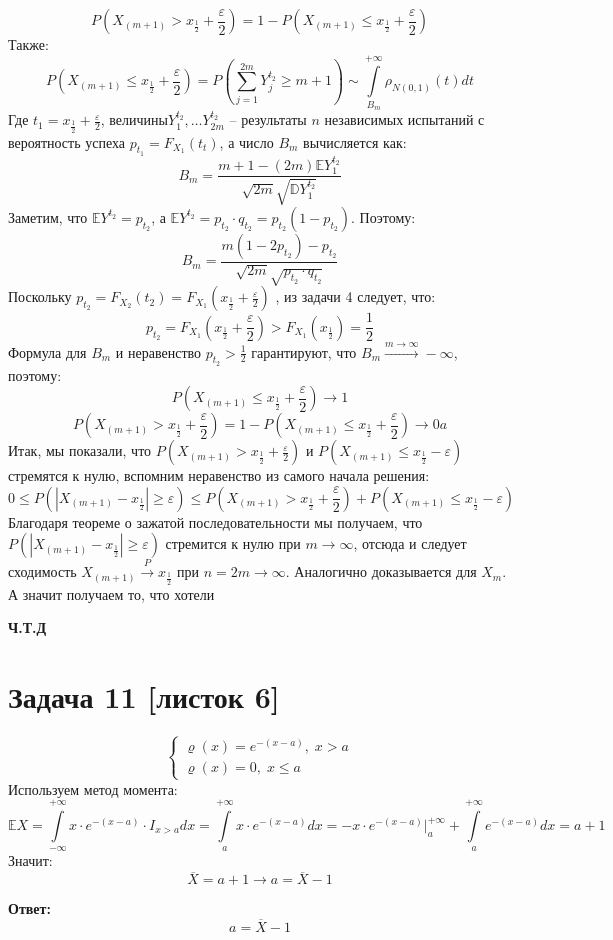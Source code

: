 \documentclass[a4paper,12pt]{article}
\begin{document}
\[
P\left(X_{(m + 1)} > x_{\frac12} + \frac{\varepsilon}{2}\right) = 1 - P\left(X_{(m + 1)} \leq  x_{\frac12} + \frac{\varepsilon}{2}\right) 
\]
Также:
\[
P\left(X_{(m + 1)} \leq  x_{\frac12} + \frac{\varepsilon}{2}\right)  = P \left(
\sum_{j = 1}^{2m} Y_j^{t_2} \geq m + 1
\right) \sim \int\limits_{B_m}^{+\infty} \rho_{N(0, 1)} (t) dt 
\]
Где $t_1 = x_{\frac12} + \frac{\varepsilon}{2}$, величины$Y_1^{t_2}, \ldots Y_{2m}^{t_2}$ -- результаты $n$ независимых испытаний с вероятность успеха $p_{t_1} = F_{X_1}(t_t)$, а число $B_m$ вычисляется как:
\[
B_m = \frac{m + 1 - (2m) \mathbb{E} Y_1^{t_2}}{\sqrt{2m} \sqrt{\mathbb{D} Y_1^{t_2}}} 
\]
Заметим, что $\mathbb{E} Y^{t_2} = p_{t_2}$, а $\mathbb{E} Y^{t_2} = p_{t_2} \cdot q_{t_2} = p_{t_2} (1 - p_{t_2})$. Поэтому:
\[
B_m = \frac{m(1 - 2p_{t_2}) - p_{t_2}}{\sqrt{2m} \sqrt{p_{t_2} \cdot q_{t_2}}}
\]
Поскольку $p_{t_2} = F_{X_2} (t_2) = F_{X_1} (x_{\frac{1}{2}} + \frac{\varepsilon}{2})$ , из задачи 4 следует, что:
\[
p_{t_2} = F_{X_1} (x_{\frac12} + \frac{\varepsilon}{2}) > F_{X_1} (x_{\frac12}) = \frac12 
\]
Формула для $B_m$ и неравенство $p_{t_2} > \frac12$ гарантируют, что $B_m \overset{m \rightarrow \infty}{\longrightarrow} -\infty$, поэтому:
\[
P\left(X_{(m + 1)} \leq  x_{\frac12} + \frac{\varepsilon}{2}\right)  \rightarrow 1
\]
\[
P\left(X_{(m + 1)} > x_{\frac12} + \frac{\varepsilon}{2}\right) = 1 -  P\left(X_{(m + 1)} \leq  x_{\frac12} + \frac{\varepsilon}{2}\right)  \rightarrow 0 a
\]
Итак, мы показали, что $P\left(X_{(m + 1)} > x_{\frac12} + \frac{\varepsilon}{2}\right)$ и $P\left(X_{(m + 1)} \leq  x_{\frac12} - \varepsilon \right)$ стремятся к нулю, вспомним неравенство из самого начала решения:
\[
0 \leq P \left(
|
X_{(m + 1)} - x_{\frac12} 
| 
\geq \varepsilon
\right)
\leq 
P\left(X_{(m + 1)} > x_{\frac12} + \frac{\varepsilon}{2}\right) + P\left(X_{(m + 1)} \leq  x_{\frac12} - \varepsilon \right) 
\]
Благодаря теореме о зажатой последовательности мы получаем, что $P(|X_{(m + 1)} - x_{\frac12}| \geq \varepsilon)$ стремится к нулю при $m \rightarrow \infty$, отсюда и следует сходимость $X_{(m + 1)} \overset{P}{ \rightarrow } x_{\frac12}$ при $n = 2m \rightarrow \infty$. Аналогично доказывается для $X_{m}$. А значит получаем то, что хотели
\begin{center}
\textbf{Ч.Т.Д} 
\end{center}
\clearpage
\section*{Задача 11 [листок 6]}
\[
\begin{cases}
\varrho(x) = e^{-(x - a)}, \; x > a \\
\varrho(x) = 0,  \; x \leq a
\end{cases}
\]
Используем метод момента:
\[
\mathbb{E} X = \int\limits_{-\infty}^{+\infty} x \cdot e^{-(x - a)} \cdot I_{x  > a}   dx = \int\limits_{a}^{+\infty} x \cdot e^{-(x - a)}  dx = -x \cdot e^{-(x - a)} \Bigg|_a^{+\infty} + \int\limits_a^{+\infty} e^{-(x - a)} dx = a + 1
\]
Значит:
\[
\overline{X} = a + 1  \rightarrow a = \overline{X} - 1
\]
\begin{center}
\textbf{Ответ: } 
\[
a = \overline{X} - 1
\]
\end{center}
\end{document}
